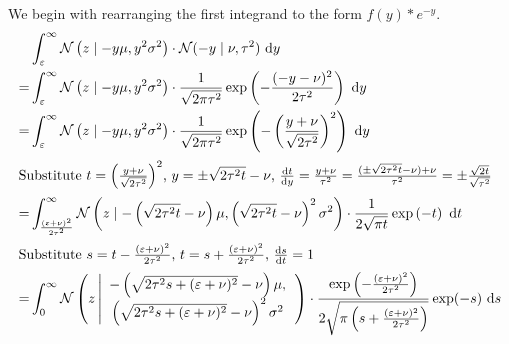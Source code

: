 \documentclass[11pt,a4paper]{book}
\newcommand{\ontopof}[2]{
  \begin{array}{c}
    #1,\\#2
  \end{array}
}
\begin{document}
We begin with rearranging the first integrand to the form $f(y) * e^{-y}$.
\begin{align*}
  & \int_{\varepsilon}^{\infty} \mathcal{N}\left( z \mid -y\mu, y^{2}\sigma^{2} \right) \cdot \mathcal{N}(-y \mid \nu, \tau^{2})~\mathrm{d}y \\
  =& \int_{\varepsilon}^{\infty} \mathcal{N}\left( z \mid -y\mu, y^{2}\sigma^{2} \right) \cdot \frac{1}{\sqrt{2 \pi \tau^{2}}} \exp\left( -\frac{(-y - \nu)^{2}}{2\tau^{2}} \right)~\mathrm{d}y\\
  =& \int_{\varepsilon}^{\infty} \mathcal{N}\left( z \mid -y\mu, y^{2}\sigma^{2} \right) \cdot \frac{1}{\sqrt{2 \pi \tau^{2}}} \exp\left( -\left( \frac{y + \nu}{\sqrt{2\tau^{2}}} \right)^{2} \right)~\mathrm{d}y\\
  \intertext{Substitute $t = \left( \frac{y + \nu}{\sqrt{2\tau^{2}}} \right)^{2}$, $y = \pm \sqrt{2\tau^{2} t} - \nu$, $\frac{\mathrm{d}t}{\mathrm{d}y} = \frac{y + \nu}{\tau^{2}} = \frac{(\pm \sqrt{2\tau^{2} t} - \nu) + \nu}{\tau^{2}} = \pm \frac{\sqrt{2t}}{\sqrt{\tau^{2}}}$}
  =& \int_{\frac{(\varepsilon + \nu)^{2}}{2\tau^{2}}}^{\infty} \mathcal{N}\left( z \mid -\left( \sqrt{2\tau^{2} t} - \nu \right)\mu, \left( \sqrt{2\tau^{2} t} - \nu \right)^{2}\sigma^{2} \right) \cdot \frac{1}{2 \sqrt{\pi t}} \exp\left( -t \right)~\mathrm{d}t\\
  \intertext{Substitute $s = t - \frac{(\varepsilon + \nu)^{2}}{2\tau^{2}}$, $t = s + \frac{(\varepsilon + \nu)^{2}}{2\tau^{2}}$, $\frac{\mathrm{d}s}{\mathrm{d}t} = 1$}
  =& \int_{0}^{\infty} \mathcal{N}\left( z \left| \ontopof{-\left( \sqrt{2\tau^{2}s + (\varepsilon + \nu)^{2}} - \nu \right)\mu}{\left( \sqrt{2\tau^{2}s + (\varepsilon + \nu)^{2}} - \nu \right)^{2}\sigma^{2}} \right.\right) \cdot \frac{\exp\left( -\frac{(\varepsilon + \nu)^{2}}{2\tau^{2}} \right)}{2 \sqrt{\pi \left( s + \frac{(\varepsilon + \nu)^{2}}{2\tau^{2}} \right)}} \exp(-s)~\mathrm{d}s
\end{align*}
\end{document}
